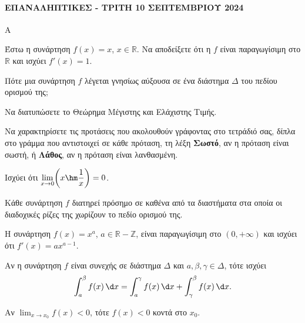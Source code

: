 \paragraph{ΕΠΑΝΑΛΗΠΤΙΚΕΣ - ΤΡΙΤΗ 10 ΣΕΠΤΕΜΒΡΙΟΥ 2024}
\begin{thema}{Α}
\begin{erwthma}
    \item Έστω η συνάρτηση $f(x) = x$, $x \in \mathbb{R}$. Να αποδείξετε ότι η $f$ είναι παραγωγίσιμη στο $\mathbb{R}$ και ισχύει $f'(x) = 1$. 

    \item Πότε μια συνάρτηση $f$ λέγεται γνησίως αύξουσα σε ένα διάστημα $\Delta$ του πεδίου ορισμού της; 

    \item Να διατυπώσετε το Θεώρημα Μέγιστης και Ελάχιστης Τιμής. 

    \item Να χαρακτηρίσετε τις προτάσεις που ακολουθούν γράφοντας στο τετράδιό σας, δίπλα στο γράμμα που αντιστοιχεί σε κάθε πρόταση, τη λέξη \textbf{Σωστό}, αν η πρόταση είναι σωστή, ή \textbf{Λάθος}, αν η πρόταση είναι λανθασμένη.
    \begin{alist}
        \item Ισχύει ότι $\displaystyle\lim_{x \to 0}\!\left(x\hm\dfrac{1}{x}\right) = 0$.

        \item Κάθε συνάρτηση $f$ διατηρεί πρόσημο σε καθένα από τα διαστήματα στα οποία οι διαδοχικές ρίζες της χωρίζουν το πεδίο ορισμού της.

        \item Η συνάρτηση $f(x) = x^a$, $a \in \mathbb{R} - \mathbb{Z}$, είναι παραγωγίσιμη στο $(0, +\infty)$ και ισχύει ότι $f'(x) = a x^{a - 1}$.

        \item Αν η συνάρτηση $f$ είναι συνεχής σε διάστημα $\Delta$ και $a, \beta, \gamma \in \Delta$, τότε ισχύει
        \[
        \int_a^\beta f(x)\,\d x = \int_a^\gamma f(x)\,\d x + \int_\gamma^\beta f(x)\,\d x.
        \]

        \item Αν $\displaystyle\lim_{x \to x_0} f(x) < 0$, τότε $f(x) < 0$ κοντά στο $x_0$.
    \end{alist}
\end{erwthma}
\end{thema}


